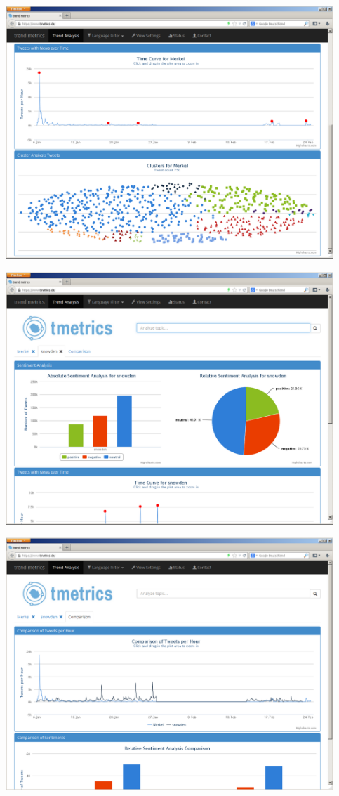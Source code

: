 \begin{frame}
    \includegraphics[width=0.926\textwidth]{../img/shots/03.png}
\end{frame}

\begin{frame}
    \includegraphics[width=0.926\textwidth]{../img/shots/04.png}
\end{frame}

\begin{frame}
    \includegraphics[width=0.926\textwidth]{../img/shots/06.png}
\end{frame}

